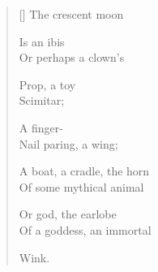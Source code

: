\label{ch:over_venezia}
\settowidth{\versewidth}{                          Wink.}
\begin{verse}[\versewidth]
The crescent moon

Is an ibis\\
Or perhaps a clown's

Prop, a toy\\
Scimitar;

A finger-\\
Nail paring, a wing;

A boat, a cradle, the horn\\
Of some mythical animal

Or god, the earlobe\\
Of a goddess, an immortal

\hspace*{3\vgap} Wink.
\end{verse}
